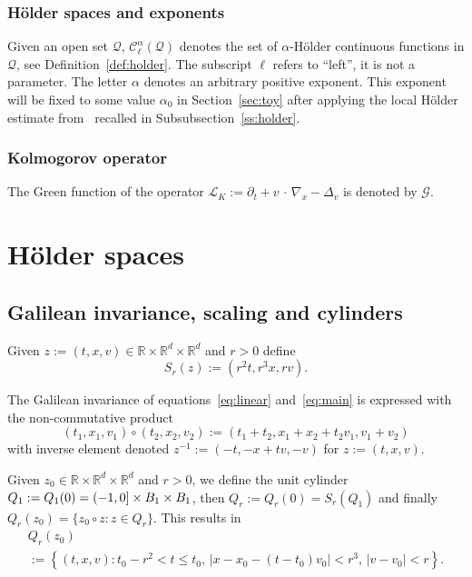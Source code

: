 \documentclass[AHL,Unicode,longabstracts,published]{cedram}
\newcommand{\R}{\mathbb{R}}
\newcommand{\cC}{\mathcal{C}}
\newcommand{\cL}{\mathcal{L}}
\newcommand{\cG}{\mathcal{G}}
\newcommand{\cQ}{\mathcal{Q}}
\begin{document}
\subsubsection{H\"older spaces and exponents}
Given an open set $\cQ$, $\cC_\ell^\alpha (\cQ)$ denotes the set of $\alpha$-H\"older continuous functions in $\cQ$, see Definition~\ref{def:holder}. The subscript $\ell$ refers to ``left'', it is not a parameter. The letter $\alpha$ denotes an arbitrary positive exponent. This exponent will be fixed to some value $\alpha_0$ in Section~\ref{sec:toy} after applying the local H\"older estimate from~\cite{gimv,wz09} recalled in Subsubsection~\ref{ss:holder}.

\subsubsection{Kolmogorov operator}
The Green function of the operator $\cL_K := \partial_t + v \,\cdot\,\nabla_x-\Delta_v$ is denoted by $\cG$.

\section{H\"older spaces}\label{sec:prelim}

\subsection{Galilean invariance, scaling and cylinders}

Given $z := (t,x,v) \in \R \times \R^d \times \R^d$ and $r>0$ define
\begin{equation}\label{eq:scaling}
S_r(z) := \left(r^2 t,r^3 x, r v\right).
\end{equation}

The Galilean invariance of equations~\eqref{eq:linear} and~\eqref{eq:main} is expressed with the non-commutative product
\[
\left(t_1,x_1,v_1\right) \circ \left(t_2,x_2,v_2\right) := \left(t_1+t_2,x_1 +x_2 + t_2 v_1,v_1 + v_2\right)
\]
with inverse element denoted $z^{-1} := (-t,-x+tv,-v)$ for $z:=(t,x,v)$.

Given $z_0 \in \R \times \R^d \times \R^d$ and $r >0$, we define the unit cylinder $Q_1:=Q_1(0)\linebreak=(-1,0]\times B_1 \times B_1$, then $Q_r:=Q_r(0) = S_r(Q_1)$ and finally $Q_r (z_0) = \{ z_0 \circ z: z \in Q_r\}$. This results in
\begin{multline}\label{eq:def-cyl}
Q_r (z_0)\\
:= \left\{ (t,x,v) : t_0 - r^2 < t \le t_0, \, |x-x_0 - (t-t_0)v_0| < r^3, \, |v-v_0| < r \right\}.
\end{multline}
\end{document}
